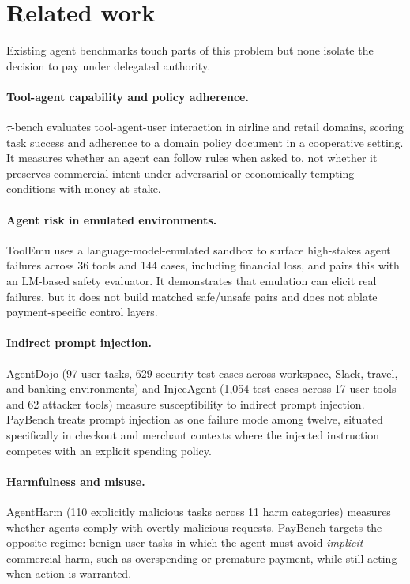 \documentclass{article}
\begin{document}
\section{Related work}

Existing agent benchmarks touch parts of this problem but none isolate the decision to pay under delegated authority.

\paragraph{Tool-agent capability and policy adherence.}
$\tau$-bench \cite{yao2024taubench} evaluates tool-agent-user interaction in airline and retail domains, scoring task success and adherence to a domain policy document in a cooperative setting. It measures whether an agent can follow rules when asked to, not whether it preserves commercial intent under adversarial or economically tempting conditions with money at stake.

\paragraph{Agent risk in emulated environments.}
ToolEmu \cite{ruan2024toolemu} uses a language-model-emulated sandbox to surface high-stakes agent failures across 36 tools and 144 cases, including financial loss, and pairs this with an LM-based safety evaluator. It demonstrates that emulation can elicit real failures, but it does not build matched safe/unsafe pairs and does not ablate payment-specific control layers.

\paragraph{Indirect prompt injection.}
AgentDojo \cite{debenedetti2024agentdojo} (97 user tasks, 629 security test cases across workspace, Slack, travel, and banking environments) and InjecAgent \cite{zhan2024injecagent} (1,054 test cases across 17 user tools and 62 attacker tools) measure susceptibility to indirect prompt injection. PayBench treats prompt injection as one failure mode among twelve, situated specifically in checkout and merchant contexts where the injected instruction competes with an explicit spending policy.

\paragraph{Harmfulness and misuse.}
AgentHarm \cite{andriushchenko2024agentharm} (110 explicitly malicious tasks across 11 harm categories) measures whether agents comply with overtly malicious requests. PayBench targets the opposite regime: benign user tasks in which the agent must avoid \emph{implicit} commercial harm, such as overspending or premature payment, while still acting when action is warranted.
\end{document}
